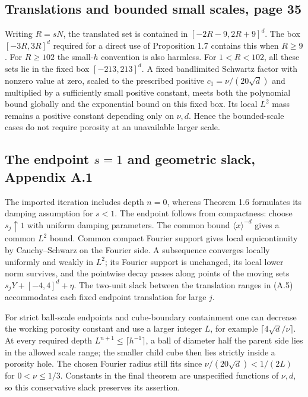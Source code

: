 \documentclass[10pt]{article}
\begin{document}
\subsection*{Translations and bounded small scales, page 35}
Writing \(R=sN\), the translated set is contained in \([-2R-9,2R+9]^d\). The box \([-3R,3R]^d\) required for a direct use of Proposition 1.7 contains this when \(R\geq9\). For \(R\geq102\) the small-\(h\) convention is also harmless. For \(1<R<102\), all these sets lie in the fixed box \([-213,213]^d\). A fixed bandlimited Schwartz factor with nonzero value at zero, scaled to the prescribed positive \(c_1=\nu/(20\sqrt d)\) and multiplied by a sufficiently small positive constant, meets both the polynomial bound globally and the exponential bound on this fixed box. Its local \(L^2\) mass remains a positive constant depending only on \(\nu,d\). Hence the bounded-scale cases do not require porosity at an unavailable larger scale.\par
\subsection*{The endpoint \(s=1\) and geometric slack, Appendix A.1}
The imported iteration includes depth \(n=0\), whereas Theorem 1.6 formulates its damping assumption for \(s<1\). The endpoint follows from compactness: choose \(s_j\uparrow1\) with uniform damping parameters. The common bound \(\langle x\rangle^{-d}\) gives a common \(L^2\) bound. Common compact Fourier support gives local equicontinuity by Cauchy–Schwarz on the Fourier side. A subsequence converges locally uniformly and weakly in \(L^2\); its Fourier support is unchanged, its local lower norm survives, and the pointwise decay passes along points of the moving sets \(s_jY+[-4,4]^d+\eta\). The two-unit slack between the translation ranges in (A.5) accommodates each fixed endpoint translation for large \(j\).\par
For strict ball-scale endpoints and cube-boundary containment one can decrease the working porosity constant and use a larger integer \(L\), for example \(\lceil4\sqrt d/\nu\rceil\). At every required depth \(L^{n+1}\leq\lceil h^{-1}\rceil\), a ball of diameter half the parent side lies in the allowed scale range; the smaller child cube then lies strictly inside a porosity hole. The chosen Fourier radius still fits since \(\nu/(20\sqrt d)<1/(2L)\) for \(0<\nu\leq1/3\). Constants in the final theorem are unspecified functions of \(\nu,d\), so this conservative slack preserves its assertion.\par
\end{document}
